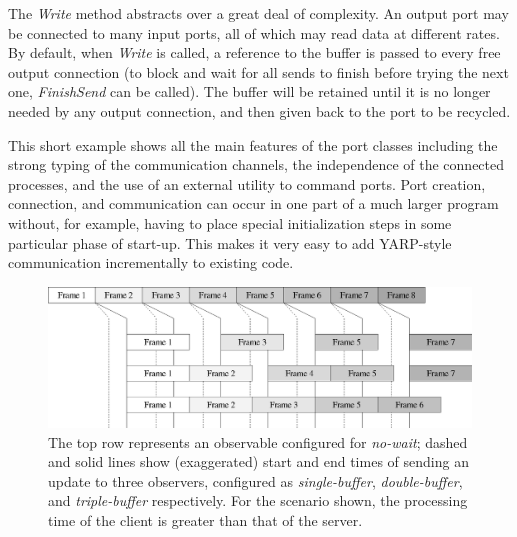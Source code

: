 The {\em Write} method abstracts over a great deal of complexity.
An output port may be connected to many input ports, all of which
may read data at different rates.  By default, when {\em Write}
is called, a reference to the buffer is passed to
every free output connection (to block and wait for all sends to finish before trying the next one, {\em FinishSend} can be called).  The buffer will be retained
until it is no longer needed by any output connection, and then
given back to the port to be recycled.  

This short example shows all the main features of the port classes including the strong
typing of the communication channels, the independence of the connected processes, and
the use of an external utility to command ports.
%
Port creation, connection, and communication can occur in one part of a much larger
program without, for example, having to place special initialization steps in some
particular phase of start-up.  This makes it very easy to add YARP-style communication
incrementally to existing code.


\begin{figure}[t]
\includegraphics[width=\columnwidth]{fig-throughput-nowait}
\caption{
The top row represents an observable configured for \textit{no-wait};
dashed and solid lines show (exaggerated) start and end times of 
sending an update to three observers, configured as
 \textit{single-buffer},
 \textit{double-buffer},
and \textit{triple-buffer}
respectively.  For the scenario shown, the processing time of the
client is greater than that of the server.
}
\label{fig:throughput-nowait}
\end{figure}


